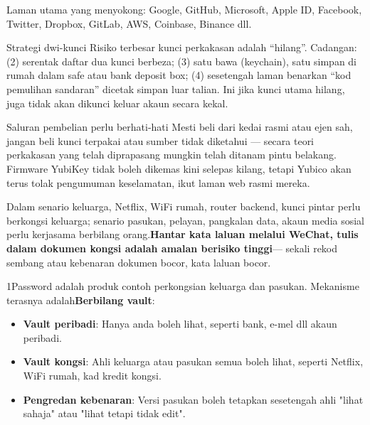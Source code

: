 Laman utama yang menyokong: Google, GitHub, Microsoft, Apple ID, Facebook, Twitter, Dropbox, GitLab, AWS, Coinbase, Binance dll.

\begin{tcbinfo}{Strategi dwi-kunci}
Risiko terbesar kunci perkakasan adalah “hilang”. Cadangan: (2) serentak daftar dua kunci berbeza; (3) satu bawa (keychain), satu simpan di rumah dalam safe atau bank deposit box; (4) sesetengah laman benarkan “kod pemulihan sandaran” dicetak simpan luar talian. Ini jika kunci utama hilang, juga tidak akan dikunci keluar akaun secara kekal.

\end{tcbinfo}

\begin{tcbwarn}{Saluran pembelian perlu berhati-hati}
Mesti beli dari kedai rasmi atau ejen sah, jangan beli kunci terpakai atau sumber tidak diketahui — secara teori perkakasan yang telah diprapasang mungkin telah ditanam pintu belakang. Firmware YubiKey tidak boleh dikemas kini selepas kilang, tetapi Yubico akan terus tolak pengumuman keselamatan, ikut laman web rasmi mereka.

\end{tcbwarn}


Dalam senario keluarga, Netflix, WiFi rumah, router backend, kunci pintar perlu berkongsi keluarga; senario pasukan, pelayan, pangkalan data, akaun media sosial perlu kerjasama berbilang orang.\textbf{Hantar kata laluan melalui WeChat, tulis dalam dokumen kongsi adalah amalan berisiko tinggi}— sekali rekod sembang atau kebenaran dokumen bocor, kata laluan bocor.


1Password adalah produk contoh perkongsian keluarga dan pasukan. Mekanisme terasnya adalah\textbf{Berbilang vault}:

\begin{itemize}
  \item \textbf{Vault peribadi}: Hanya anda boleh lihat, seperti bank, e-mel dll akaun peribadi.
  \item \textbf{Vault kongsi}: Ahli keluarga atau pasukan semua boleh lihat, seperti Netflix, WiFi rumah, kad kredit kongsi.
  \item \textbf{Pengredan kebenaran}: Versi pasukan boleh tetapkan sesetengah ahli "lihat sahaja" atau "lihat tetapi tidak edit".
\end{itemize}

